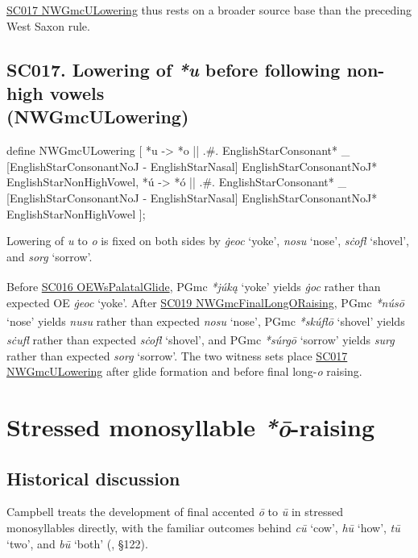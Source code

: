 \documentclass[
  british,
  a4paper,
  openany]{book}
\providecommand{\Pred}[1]{\textsuperscript{\dag}\emph{#1}}
\providecommand{\Recon}[1]{\emph{*#1}}
{\catcode`→=\active \global\def→{\ensuremath{\rightarrow}}}
\providecommand{\texorpdfstring}[2]{#1}
\DeclareRobustCommand{\CAPRRuleHeading}[2]{%
  #1\texorpdfstring{\\(#2)}{ (#2)}%
}
\providecommand{\Pred}[1]{\textsuperscript{\dag}\emph{#1}}
\providecommand{\Recon}[1]{\emph{*#1}}
{\catcode`→=\active \global\def→{\ensuremath{\rightarrow}}}
\begin{document}
\hyperref[rule-NWGmcULowering]{SC017 NWGmcULowering} thus rests on a
broader source base than the preceding West Saxon rule.

\subsection{\texorpdfstring{\CAPRRuleHeading{SC017. Lowering of \emph{*u} before following non-high vowels}{NWGmcULowering}}{}}\label{rule-NWGmcULowering}

\begin{ReaderFacingFoma}
define NWGmcULowering [
    {*u} -> {*o}
        || .#. EnglishStarConsonant* _
           [EnglishStarConsonantNoJ - EnglishStarNasal]
           EnglishStarConsonantNoJ* EnglishStarNonHighVowel,
    {*ú} -> {*ó}
        || .#. EnglishStarConsonant* _
           [EnglishStarConsonantNoJ - EnglishStarNasal]
           EnglishStarConsonantNoJ* EnglishStarNonHighVowel
];
\end{ReaderFacingFoma}

Lowering of \emph{u} to \emph{o} is fixed on both sides by \emph{ġeoc}
`yoke', \emph{nosu} `nose', \emph{sċofl} `shovel', and \emph{sorg}
`sorrow'.

Before \hyperref[rule-OEWsPalatalGlide]{SC016 OEWsPalatalGlide}, PGmc
\Recon{júką} `yoke' yields \Pred{ġoc} rather than expected OE
\emph{ġeoc} `yoke'. After \hyperref[rule-NWGmcFinalLongORaising]{SC019
NWGmcFinalLongORaising}, PGmc \Recon{núsō} `nose' yields \Pred{nusu}
rather than expected \emph{nosu} `nose', PGmc \Recon{skúflō} `shovel'
yields \Pred{sċufl} rather than expected \emph{sċofl} `shovel', and PGmc
\Recon{súrgō} `sorrow' yields \Pred{surg} rather than expected
\emph{sorg} `sorrow'. The two witness sets place
\hyperref[rule-NWGmcULowering]{SC017 NWGmcULowering} after glide
formation and before final long-\emph{o} raising.

\newpage

\section{\texorpdfstring{Stressed monosyllable
\emph{*ō}-raising}{Stressed monosyllable -raising}}\label{stressed-monosyllable--raising}

\subsection{Historical discussion}\label{historical-discussion-12}

Campbell treats the development of final accented \emph{ō} to \emph{ū}
in stressed monosyllables directly, with the familiar outcomes behind
\emph{cū} `cow', \emph{hū} `how', \emph{tū} `two', and \emph{bū} `both'
(, §122).
\end{document}
